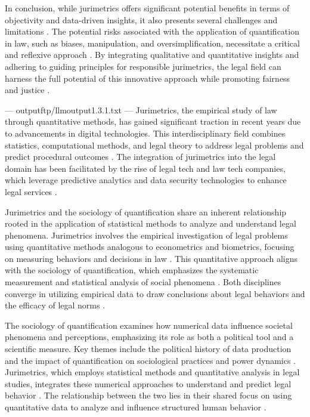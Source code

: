 In conclusion, while jurimetrics offers significant potential benefits in terms of objectivity and data-driven insights, it also presents several challenges and limitations \cite{10.1007/s11186-021-09453-1,demortain2019politics}. The potential risks associated with the application of quantification in law, such as biases, manipulation, and oversimplification, necessitate a critical and reflexive approach \cite{10.1007/s11186-021-09453-1,demortain2019politics}. By integrating qualitative and quantitative insights and adhering to guiding principles for responsible jurimetrics, the legal field can harness the full potential of this innovative approach while promoting fairness and justice \cite{10.1007/s11186-021-09453-1,demortain2019politics}.


---
outputftp/llmoutput1.3.1.txt
---
Jurimetrics, the empirical study of law through quantitative methods, has gained significant traction in recent years due to advancements in digital technologies. This interdisciplinary field combines statistics, computational methods, and legal theory to address legal problems and predict procedural outcomes \cite{silva2023role,103390fi9040068}. The integration of jurimetrics into the legal domain has been facilitated by the rise of legal tech and law tech companies, which leverage predictive analytics and data security technologies to enhance legal services \cite{silva2023role}.

Jurimetrics and the sociology of quantification share an inherent relationship rooted in the application of statistical methods to analyze and understand legal phenomena. Jurimetrics involves the empirical investigation of legal problems using quantitative methods analogous to econometrics and biometrics, focusing on measuring behaviors and decisions in law \cite{nunes2016,zabala1809}. This quantitative approach aligns with the sociology of quantification, which emphasizes the systematic measurement and statistical analysis of social phenomena \cite{nunes2016}. Both disciplines converge in utilizing empirical data to draw conclusions about legal behaviors and the efficacy of legal norms \cite{luvizotto2020,maia2039,nunes2016}.

The sociology of quantification examines how numerical data influence societal phenomena and perceptions, emphasizing its role as both a political tool and a scientific measure. Key themes include the political history of data production and the impact of quantification on sociological practices and power dynamics \cite{paiva2021,camargo2021,saltelli2020}. Jurimetrics, which employs statistical methods and quantitative analysis in legal studies, integrates these numerical approaches to understand and predict legal behavior \cite{de2010,nunes2016}. The relationship between the two lies in their shared focus on using quantitative data to analyze and influence structured human behavior \cite{nunes2016,luvizotto2020}.

